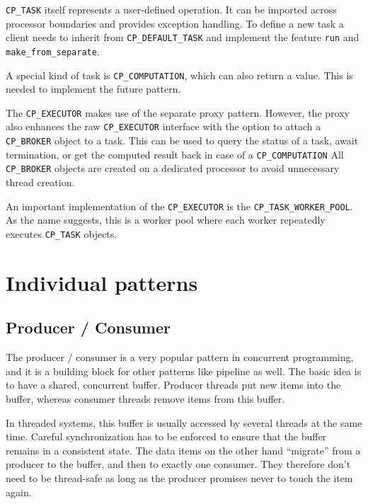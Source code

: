 \documentclass[a4paper,10pt]{report}
\begin{document}
\lstinline!CP_TASK! itself represents a user-defined operation.
It can be imported across processor boundaries and provides exception handling.
To define a new task a client needs to inherit from \lstinline!CP_DEFAULT_TASK! and implement the feature \lstinline!run! and \lstinline!make_from_separate!.

A special kind of task is \lstinline!CP_COMPUTATION!, which can also return a value.
This is needed to implement the future pattern.

The \lstinline!CP_EXECUTOR! makes use of the separate proxy pattern.
However, the proxy also enhances the raw \lstinline!CP_EXECUTOR! interface with the option to attach a \lstinline!CP_BROKER! object to a task.
This can be used to query the status of a task, await termination, or get the computed result back in case of a \lstinline!CP_COMPUTATION!
All \lstinline!CP_BROKER! objects are created on a dedicated processor to avoid unnecessary thread creation.

An important implementation of the \lstinline!CP_EXECUTOR! is the \lstinline!CP_TASK_WORKER_POOL!.
As the name suggests, this is a worker pool where each worker repeatedly executes \lstinline!CP_TASK! objects.

\section {Individual patterns}

\subsection{Producer / Consumer}

The producer / consumer is a very popular pattern in concurrent programming, and it is a building block for other patterns like pipeline as well.
The basic idea is to have a shared, concurrent buffer.
Producer threads put new items into the buffer, whereas consumer threads remove items from this buffer.


In threaded systems, this buffer is usually accessed by several threads at the same time.
Careful synchronization has to be enforced to ensure that the buffer remains in a consistent state.
The data items on the other hand ``migrate'' from a producer to the buffer, and then to exactly one consumer.
They therefore don't need to be thread-safe as long as the producer promises never to touch the item again.
\end{document}
